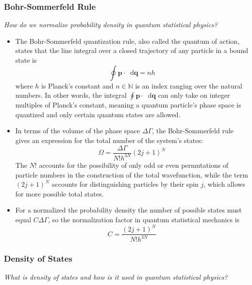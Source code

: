 \documentclass[11pt, a4paper]{article}
\newcommand{\diff}{\mathop{}\!\mathrm{d}} %
\begin{document}
\subsubsection{Bohr-Sommerfeld Rule}
\textit{How do we normalize probability density in quantum statistical physics?}
\begin{itemize}

	\item The Bohr-Sommerfeld quantization rule, also called the quantum of action, states that the line integral over a closed trajectory of any particle in a bound state is
	\begin{equation*}
		\oint \bm{p} \cdot \diff \bm{q} = n h
	\end{equation*}
	where $ h $ is Planck's constant and $ n \in \mathbb{N} $ is an index ranging over the natural numbers. In other words, the integral $ \oint \bm{p} \cdot \diff \bm{q} $ can only take on integer multiples of Planck's constant, meaning a quantum particle's phase space is quantized and only certain quantum states are allowed.
	
	\item In terms of the volume of the phase space $ \Delta \Gamma $, the Bohr-Sommerfeld rule gives an expression for the total number of the system's states:
	\begin{equation*}
		\Omega = \frac{\Delta \Gamma}{N! h^{3N}}(2j+1)^{N}
	\end{equation*}
	The $ N! $ accounts for the possibility of only odd or even permutations of particle numbers in the construction of the total wavefunction, while the term $ (2j+1)^{N} $ accounts for distinguishing particles by their spin $ j $, which allows for more possible total states. 
	
	\item For a normalized the probability density the number of possible states must equal $ C \Delta \Gamma $, so the normalization factor in quantum statistical mechanics is
	\begin{equation*}
		C = \frac{(2j+1)^{N}}{N!h^{3N}}
	\end{equation*}

\end{itemize}


\subsubsection{Density of States}
\textit{What is density of states and how is it used in quantum statistical physics?}
\end{document}
